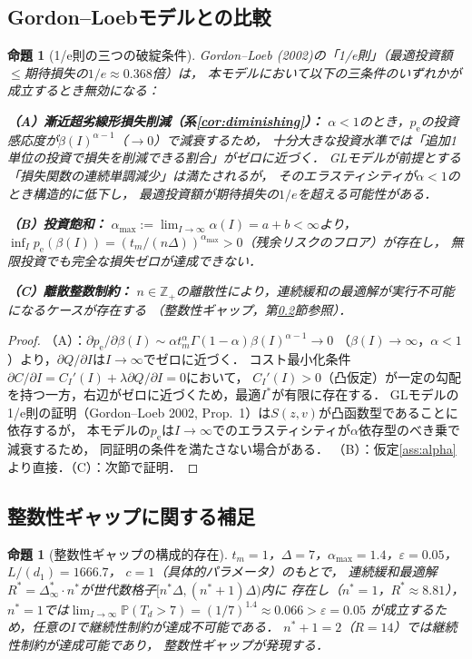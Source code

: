 \documentclass[12pt,a4paper]{article}
\theoremstyle{plain}
\newtheorem{proposition}[theorem]{命題}
\theoremstyle{definition}
\theoremstyle{remark}
\newcommand{\Prob}{\mathbb{P}}
\newcommand{\Z}{\mathbb{Z}}
\newcommand{\pe}{p_{\mathrm{e}}}
\newcommand{\betaI}{\beta(I)}
\newcommand{\Dopt}{\Delta^{*}}
\begin{document}
\subsection{Gordon--Loebモデルとの比較}

\begin{proposition}[1/e則の三つの破綻条件]\label{prop:gl}
Gordon--Loeb (2002)の「1/e則」（最適投資額$\le$期待損失の$1/e\approx0.368$倍）は，
本モデルにおいて以下の三条件のいずれかが成立するとき無効になる：

\noindent\textbf{（A）漸近超劣線形損失削減（系\ref{cor:diminishing}）：}
$\alpha<1$のとき，$\pe$の投資感応度が$\betaI^{\alpha-1}$（$\to0$）で減衰するため，
十分大きな投資水準では「追加1単位の投資で損失を削減できる割合」がゼロに近づく．
GLモデルが前提とする「損失関数の連続単調減少」は満たされるが，
その\emph{エラスティシティ}が$\alpha<1$のとき構造的に低下し，
最適投資額が期待損失の$1/e$を超える可能性がある．

\noindent\textbf{（B）投資飽和：}
$\alpha_{\max}:=\lim_{I\to\infty}\alpha(I)=a+b<\infty$より，
$\inf_I\pe(\betaI)=(t_m/(n\Delta))^{\alpha_{\max}}>0$（残余リスクのフロア）が存在し，
無限投資でも完全な損失ゼロが達成できない．

\noindent\textbf{（C）離散整数制約：}
$n\in\Z_+$の離散性により，連続緩和の最適解が実行不可能になるケースが存在する
（整数性ギャップ，第\ref{sec:gap_note}節参照）．
\end{proposition}

\begin{proof}
（A）：$\partial\pe/\partial\betaI\sim\alpha t_m^\alpha\Gamma(1-\alpha)\betaI^{\alpha-1}\to0$
（$\betaI\to\infty$，$\alpha<1$）より，$\partial Q/\partial I$は$I\to\infty$でゼロに近づく．
コスト最小化条件$\partial C/\partial I=C_I'(I)+\lambda\partial Q/\partial I=0$において，
$C_I'(I)>0$（凸仮定）が一定の勾配を持つ一方，右辺がゼロに近づくため，最適$I^*$が有限に存在する．
GLモデルの1/e則の証明（Gordon--Loeb 2002, Prop.~1）は$S(z,v)$が凸函数型であることに依存するが，
本モデルの$\pe$は$I\to\infty$でのエラスティシティが$\alpha$依存型のべき乗で減衰するため，
同証明の条件を満たさない場合がある．
（B）：仮定\ref{ass:alpha}より直接．（C）：次節で証明．
\end{proof}

\subsection{整数性ギャップに関する補足}
\label{sec:gap_note}

\begin{proposition}[整数性ギャップの構成的存在]\label{prop:gap}
$t_m=1$，$\Delta=7$，$\alpha_{\max}=1.4$，$\varepsilon=0.05$，$L/(d_1)=1666.7$，
$c=1$（具体的パラメータ）のもとで，
連続緩和最適解$R^*=\Dopt_\infty\cdot n^*$が世代数格子$[n^*\Delta,(n^*+1)\Delta)$内に
存在し（$n^*=1$，$R^*\approx8.81$），
$n^*=1$では$\lim_{I\to\infty}\Prob(T_d>7)=(1/7)^{1.4}\approx0.066>\varepsilon=0.05$
が成立するため，任意の$I$で継続性制約が達成不可能である．
$n^*+1=2$（$R=14$）では継続性制約が達成可能であり，
整数性ギャップが発現する．
\end{proposition}
\end{document}
